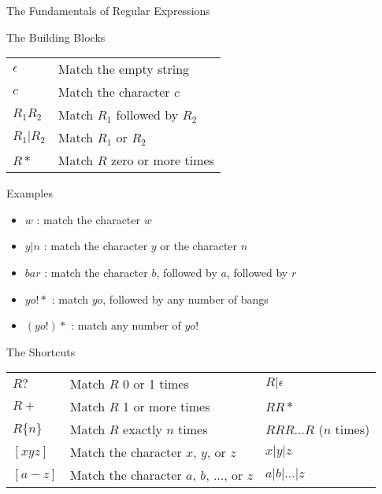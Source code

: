 \documentclass{beamer}
\renewcommand\big[1]{
  \begin{center}
    \Large{#1}
  \end{center}
}
\begin{document}
\begin{frame}
  \centering\Huge{The Fundamentals of Regular Expressions}
\end{frame}

\begin{frame}
  \big{The Building Blocks}
  \begin{center}
    \begin{tabular}{ll}
      $\epsilon$ & Match the empty string \\
      $c$ & Match the character $c$ \\
      $R_1 R_2$ & Match $R_1$ followed by $R_2$ \\
      $R_1 \vert R_2$ & Match $R_1$ or $R_2$ \\
      $R*$ & Match $R$ zero or more times
    \end{tabular}
  \end{center}
\end{frame}

\begin{frame}
  \big{Examples}
  \begin{itemize}
    \item $w$ : match the character $w$
    \item $y \vert n$ : match the character $y$ or the character $n$
    \item $bar$ : match the character $b$, followed by $a$, followed by $r$
    \item $yo!*$ : match $yo$, followed by any number of bangs
    \item $(yo!)*$ : match any number of $yo!$
  \end{itemize}
\end{frame}

\begin{frame}
  \big{The Shortcuts}
  \begin{center}
    \begin{tabular}{lll}
      $R?$ & Match $R$ 0 or 1 times & $R \vert \epsilon$ \\
      $R+$ & Match $R$ 1 or more times & $RR*$ \\
      $R\{n\}$ & Match $R$ exactly $n$ times & $RRR...R$ ($n$ times) \\
      $[xyz]$ & Match the character $x$, $y$, or $z$ & $x \vert y \vert z$ \\
      $[a-z]$ & Match the character $a$, $b$, ..., or $z$ & $a \vert b \vert ... \vert z$
    \end{tabular}
  \end{center}
\end{frame}
\end{document}
